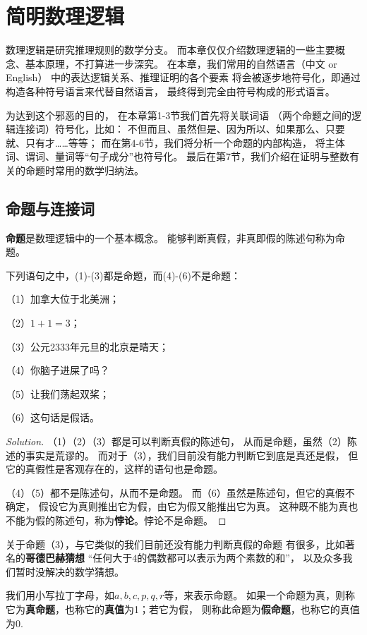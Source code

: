 \section{简明数理逻辑}

数理逻辑是研究推理规则的数学分支。
而本章仅仅介绍数理逻辑的一些主要概念、基本原理，不打算进一步深究。
在本章，我们常用的自然语言（中文 or English）
中的表达逻辑关系、推理证明的各个要素
将会被逐步地符号化，即通过构造各种符号语言来代替自然语言，
最终得到完全由符号构成的形式语言。

为达到这个邪恶的目的，
在本章第1-3节我们首先将关联词语
（两个命题之间的逻辑连接词）符号化，比如：
不但而且、虽然但是、因为所以、如果那么、只要就、只有才……等等；
而在第4-6节，我们将分析一个命题的内部构造，
将主体词、谓词、量词等“句子成分”也符号化。
最后在第7节，我们介绍在证明与整数有关的命题时常用的数学归纳法。

\subsection{命题与连接词}
\textbf{命题}是数理逻辑中的一个基本概念。
能够判断真假，非真即假的陈述句称为命题。

\begin{example}下列语句之中，(1)-(3)都是命题，而(4)-(6)不是命题：

（1）加拿大位于北美洲；

（2）$1+1=3$；

（3）公元2333年元旦的北京是晴天；

（4）你脑子进屎了吗？

（5）让我们荡起双桨；

（6）这句话是假话。\label{examples of propositions}
\end{example}
\begin{proof}[Solution]
（1）（2）（3）都是可以判断真假的陈述句，
从而是命题，虽然（2）陈述的事实是荒谬的。
而对于（3），我们目前没有能力判断它到底是真还是假，
但它的真假性是客观存在的，这样的语句也是命题。

（4）（5）都不是陈述句，从而不是命题。
而（6）虽然是陈述句，但它的真假不确定，
假设它为真则推出它为假，由它为假又能推出它为真。
这种既不能为真也不能为假的陈述句，称为\textbf{悖论}。悖论不是命题。
\end{proof}

关于命题（3），与它类似的我们目前还没有能力判断真假的命题
有很多，比如著名的\textbf{哥德巴赫猜想}
“任何大于$4$的偶数都可以表示为两个素数的和”，
以及众多我们暂时没解决的数学猜想。\vsp

我们用小写拉丁字母，如$a,b,c,p,q,r$等，来表示命题。
如果一个命题为真，则称它为\textbf{真命题}，也称它的\textbf{真值}为1；若它为假，
则称此命题为\textbf{假命题}，也称它的真值为0.\vsp

